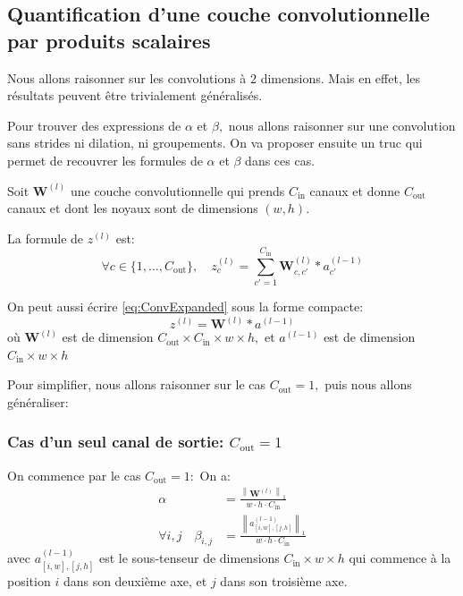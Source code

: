 \subsection{Quantification d'une couche convolutionnelle par produits scalaires }
\begin{remark}
	Nous allons raisonner sur les convolutions à $2$ dimensions. Mais en effet, les résultats peuvent être trivialement généralisés.
\end{remark}
\begin{remark}
	Pour trouver des expressions de $\alpha$ et $\beta,$ nous allons raisonner sur une convolution sans strides ni dilation, ni groupements. On va proposer ensuite un truc qui permet de recouvrer les formules de $\alpha$ et $\beta$ dans ces cas. 
\end{remark}
Soit $\boldsymbol{W}^{(l)}$ une couche convolutionnelle qui prends $C_{\text{in}}$ canaux et donne $C_{\text{out}}$ canaux et dont les noyaux sont de dimensions $(w,h)$.

La formule de $z^{(l)}$ est:
\begin{equation}\label{eq:ConvExpanded}
	\forall c\in\{1,\dots, C_{\text{out}}\},\quad z_c^{(l)}=\sum_{c'=1}^{C_\text{in}} \boldsymbol{W}_{c,c'}^{(l)}*a_{c'}^{(l-1)}
\end{equation}

\begin{remark}
	On peut aussi écrire \eqref{eq:ConvExpanded} sous la forme compacte:
	\begin{equation}
	z^{(l)}= \boldsymbol{W}^{(l)}* a^{(l-1)}
	\end{equation}
	où $\boldsymbol{W}^{(l)}$ est de dimension $C_{\text{out}}\times C_{\text{in}} \times w\times h,$ et $a^{(l-1)}$ est de dimension  $C_\text{in}\times w \times h$
\end{remark}
Pour simplifier, nous allons raisonner sur le cas $C_{\text{out}}=1,$ puis nous allons généraliser:
\subsubsection{Cas d'un seul canal de sortie: $C_{\text{out}}=1$}
On commence par le cas $C_{\text{out}}=1:$
On a:
\begin{align}
	\alpha&=\frac{\left\lVert \boldsymbol{W}^{(l)} \right\rVert_1}{w\cdot h \cdot C_{\text{in}}} \\
	\forall i,j\quad \beta_{i,j}&=\frac{\left\lVert a_{[i,w],[j,h]}^{(l-1)} \right\rVert_1}{w\cdot h \cdot C_{\text{in}} }
\end{align}
avec $a^{(l-1)}_{[i,w],[j,h]}$ est le sous-tenseur de dimensions $C_{\text{in}} \times w \times h$ qui commence à la position $i$ dans son deuxième axe, et $j$ dans son troisième axe.

